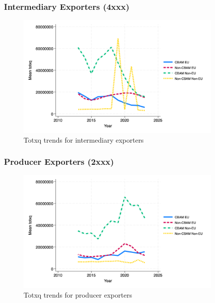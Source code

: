\documentclass{article}
\begin{document}
\subsubsection{Intermediary Exporters (4xxx)}
\begin{figure}[h!]
\centering
\includegraphics[width=0.9\textwidth]{totxq_ei.png}
\caption{Totxq trends for intermediary exporters}
\label{fig:totxq_ei}
\end{figure}

\subsubsection{Producer Exporters (2xxx)}
\begin{figure}[h!]
\centering
\includegraphics[width=0.9\textwidth]{totxq_ep.png}
\caption{Totxq trends for producer exporters}
\label{fig:totxq_ep}
\end{figure}
\end{document}

